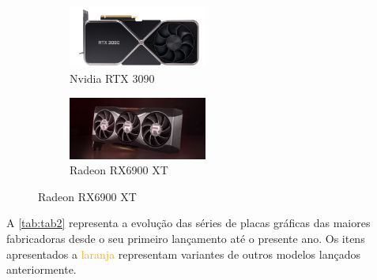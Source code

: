 \documentclass{report}
\begin{document}
\begin{figure}[h]
\begin{subfigure}[b]{0.6\textwidth}
\centering
\includegraphics[width=0.5\textwidth]{rtx_3090.png}
\caption{Nvidia RTX 3090}
\label{fig:rtx3090}
\end{subfigure}
%
\begin{subfigure}[b]{0.6\textwidth}
\centering
\includegraphics[width=0.5\textwidth]{radeon_rx_6900_xt.png}
\caption{Radeon RX6900 XT}
\label{fig:rx6900xt}
\end{subfigure}
\end{figure}

\vspace{3cm} A \autoref{tab:tab2} representa a evolução das séries de placas gráficas das maiores fabricadoras desde o seu primeiro lançamento até o presente ano. Os itens apresentados a \textcolor{orange}{laranja} representam variantes de outros modelos lançados anteriormente.
\end{document}
